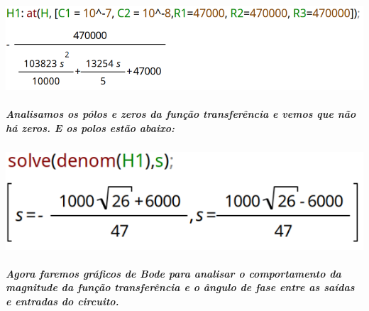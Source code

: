 \documentclass[12pt,twoside, a4paper, twocolumn]{article}
\begin{document}
\subparagraph*{}








\begin{adjustbox}{scale=0.34}
    \includegraphics{H1.png}
\end{adjustbox}








\subparagraph*{Analisamos os pólos e zeros da função transferência e vemos que não há zeros. E os polos estão abaixo:}




\subparagraph*{}




\begin{adjustbox}{scale=0.5}
    \includegraphics{H1denom.png}
\end{adjustbox}
















\subparagraph*{Agora faremos gráficos de Bode para analisar o comportamento da magnitude da função transferência e o ângulo de fase entre as saídas e entradas do circuito.}




\subparagraph*{}
\end{document}
